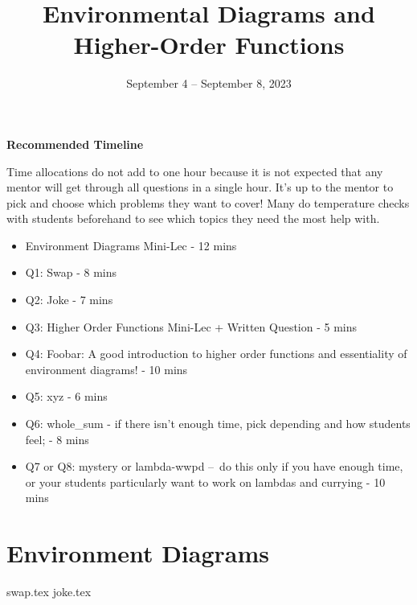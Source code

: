 \documentclass{exam}
\title{Environmental Diagrams \titlebreak and Higher-Order Functions}
\date{September 4 -- September 8, 2023}
\begin{document}
\maketitle

\begin{blocksection}
\begin{guide}
\textbf{Recommended Timeline}

Time allocations do not add to one hour because it is not expected that any mentor will get through all questions in a single hour. It's up to the mentor to pick and choose which problems they want to cover! Many do temperature checks with students beforehand to see which topics they need the most help with.

\begin{itemize}
    \item Environment Diagrams Mini-Lec - 12 mins
    \item Q1: Swap - 8 mins
    \item Q2: Joke - 7 mins
    \item Q3: Higher Order Functions Mini-Lec + Written Question - 5 mins
    \item Q4: Foobar: A good introduction to higher order functions and essentiality of environment diagrams! - 10 mins
    \item Q5: xyz - 6 mins
    \item Q6: whole\_sum - if there isn't enough time, pick depending and how students feel; - 8 mins
    \item Q7 or Q8: mystery or lambda-wwpd – do this only if you have enough time, or your students particularly want to work on lambdas and currying - 10 mins
\end{itemize}
\end{guide}
\end{blocksection}


\section{Environment Diagrams}

\begin{questions}
{swap.tex}
{joke.tex}
\end{questions}
\end{document}

